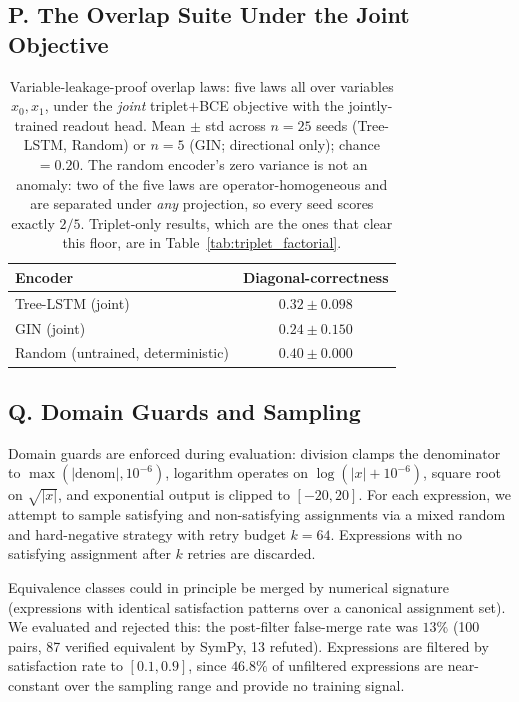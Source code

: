\FloatBarrier
\subsection*{P. The Overlap Suite Under the Joint Objective}
\label{sec:overlap}

\begin{table}[t]
\centering
\caption{Variable-leakage-proof overlap laws: five laws all over variables $x_0, x_1$, under the \emph{joint} triplet$+$BCE objective with the jointly-trained readout head. Mean $\pm$ std across $n{=}25$ seeds (Tree-LSTM, Random) or $n{=}5$ (GIN; directional only); chance $= 0.20$. The random encoder's zero variance is not an anomaly: two of the five laws are operator-homogeneous and are separated under \emph{any} projection, so every seed scores exactly $2/5$. Triplet-only results, which are the ones that clear this floor, are in Table~\ref{tab:triplet_factorial}.}
\label{tab:overlap}
\begin{tabular}{l c}
\toprule
Encoder & Diagonal-correctness \\
\midrule
Tree-LSTM (joint) & $0.32 \pm 0.098$ \\
GIN (joint)       & $0.24 \pm 0.150$ \\
Random (untrained, deterministic) & $0.40 \pm 0.000$ \\
\bottomrule
\end{tabular}
\end{table}

\subsection*{Q. Domain Guards and Sampling}

Domain guards are enforced during evaluation: division clamps the denominator to $\max(|\text{denom}|, 10^{-6})$, logarithm operates on $\log(|x| + 10^{-6})$, square root on $\sqrt{|x|}$, and exponential output is clipped to $[-20, 20]$. For each expression, we attempt to sample satisfying and non-satisfying assignments via a mixed random and hard-negative strategy with retry budget $k = 64$. Expressions with no satisfying assignment after $k$ retries are discarded.

Equivalence classes could in principle be merged by numerical signature (expressions with identical satisfaction patterns over a canonical assignment set). We evaluated and rejected this: the post-filter false-merge rate was $13\%$ (100 pairs, 87 verified equivalent by SymPy, 13 refuted). Expressions are filtered by satisfaction rate to $[0.1, 0.9]$, since $46.8\%$ of unfiltered expressions are near-constant over the sampling range and provide no training signal.

